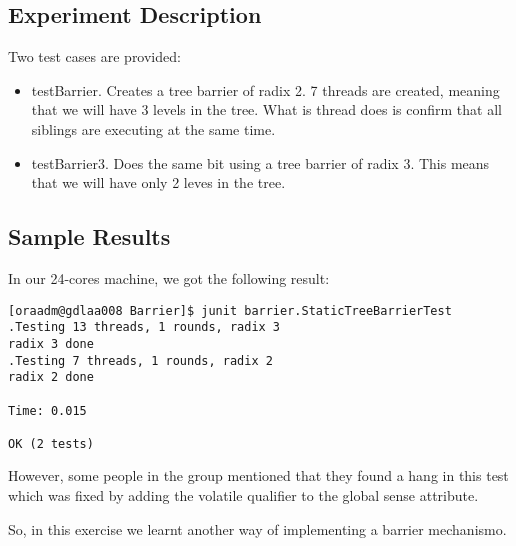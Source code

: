\subsection{Experiment Description}
\par
Two test cases are provided:
\par
\begin{itemize}
\item testBarrier. Creates a tree barrier of radix 2. 7 threads are created,
meaning that we will have 3 levels in the tree. What is thread does is confirm
that all siblings are executing at the same time. 
\item testBarrier3. Does the same bit using a tree barrier of radix 3. This
means that we will have only 2 leves in the tree.
\end{itemize}
\par
\subsection{Sample Results}
\par
In our 24-cores machine, we got the following result:
\par
\hfill
\begin{verbatim}
[oraadm@gdlaa008 Barrier]$ junit barrier.StaticTreeBarrierTest
.Testing 13 threads, 1 rounds, radix 3
radix 3 done
.Testing 7 threads, 1 rounds, radix 2
radix 2 done

Time: 0.015

OK (2 tests)
\end{verbatim}
\hfill
\par
However, some people in the group mentioned that they found a hang in this test
which was fixed by adding the volatile qualifier to the global sense attribute.
\par
So, in this exercise we learnt another way of implementing a barrier mechanismo.
\par
